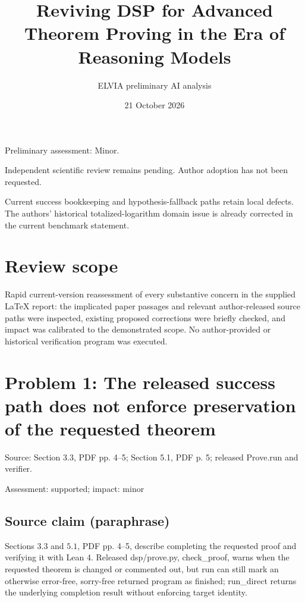 \documentclass[11pt]{article}
\begin{document}
\title{Reviving DSP for Advanced Theorem Proving in the Era of Reasoning Models}

\author{ELVIA preliminary AI analysis}\date{21 October 2026}\maketitle

Preliminary assessment: Minor.\par

Independent scientific review remains pending. Author adoption has not been requested.

Current success bookkeeping and hypothesis-fallback paths retain local defects. The authors’ historical totalized-logarithm domain issue is already corrected in the current benchmark statement.

\section*{Review scope}

Rapid current-version reassessment of every substantive concern in the supplied LaTeX report: the implicated paper passages and relevant author-released source paths were inspected, existing proposed corrections were briefly checked, and impact was calibrated to the demonstrated scope. No author-provided or historical verification program was executed.

\section*{Problem 1: The released success path does not enforce preservation of the requested theorem}

Source: Section 3.3, PDF pp. 4–5; Section 5.1, PDF p. 5; released Prove.run and verifier.

Assessment: supported; impact: minor

\subsection*{Source claim (paraphrase)}

Sections 3.3 and \(5.1\), PDF pp. 4–5, describe completing the requested proof and verifying it with Lean 4. Released dsp/prove.py, check\_proof, warns when the requested theorem is changed or commented out, but run can still mark an otherwise error-free, sorry-free returned program as finished; run\_direct returns the underlying completion result without enforcing target identity.
\end{document}
